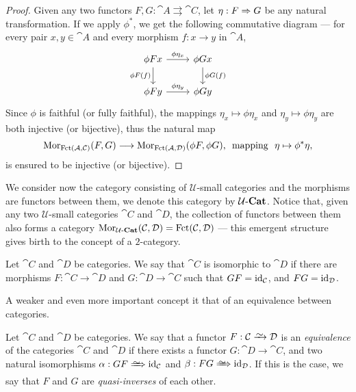 \begin{proof}
Given any two functors \(F, G: \cat A \rightrightarrows \cat C\), let \(\eta: F
\Rightarrow G\) be any natural transformation. If we apply \(\phi^{*}\), we get the
following commutative diagram --- for every pair \(x, y \in \cat A\) and every
morphism \(f: x \to y\) in \(\cat A\),
\[
  \begin{tikzcd}
    \phi F x \ar[r, "\phi \eta_x"] \ar[d, swap, "\phi F(f)"]
    &\phi G x \ar[d, "\phi G(f)"] \\
    \phi F y \ar[r, "\phi \eta_y"]
    &\phi G y
  \end{tikzcd}
\]
Since \(\phi\) is faithful (or fully faithful), the mappings \(\eta_x \mapsto
\phi \eta_x\) and \(\eta_y \mapsto \phi \eta_y\) are both injective (or
bijective), thus the natural map
\[
  \operatorname{Mor}_{\operatorname{Fct}(\mathcal A, \mathcal C)}(F, G) \longrightarrow
  \operatorname{Mor}_{\operatorname{Fct}(\mathcal A, \mathcal D)}(\phi F, \phi G)\text{,}
  \ \text{ mapping }\ \eta \mapsto \phi^{*} \eta,
\]
is ensured to be injective (or bijective).
\end{proof}

We consider now the category consisting of \(\mathcal U\)-small categories and
the morphisms are functors between them, we denote this category by
\({\mathcal{U}\text{-}\textbf{Cat}}\). Notice that, given any two \(\mathcal U\)-small categories \(\cat C\)
and \(\cat D\), the collection of functors between them also forms a category
\(\operatorname{Mor}_{{\mathcal{U}\text{-}\textbf{Cat}}}(\mathcal C, \mathcal D) = \operatorname{Fct}(\mathcal C, \mathcal D)\) --- this emergent
structure gives birth to the concept of a \(2\)-category.

\begin{definition}
\label{def:isomorphism-categories}
Let \(\cat C\) and \(\cat D\) be categories. We say that \(\cat C\) is
isomorphic to \(\cat D\) if there are morphisms \(F: \cat C \to \cat D\) and
\(G: \cat D \to \cat C\) such that \(GF = \operatorname{id}_{\mathcal C}\), and \(FG = \operatorname{id}_{\mathcal
D}\).
\end{definition}

A weaker and even more important concept it that of an equivalence between
categories.

\begin{definition}
\label{def:equivalence-categories}
Let \(\cat C\) and \(\cat D\) be categories. We say that a functor
\(F: \cat C \isoto \cat D\) is an \emph{equivalence} of the categories
\(\cat C\) and \(\cat D\) if there exists a functor \(G: \cat D \to \cat C\), and
two natural isomorphisms \(\alpha: G F \isonat \Id_{\cat C}\) and
\(\beta: F G \isonat \Id_{\cat D}\). If this is the case, we say that \(F\) and
\(G\) are \emph{quasi-inverses} of each other.
\end{definition}

